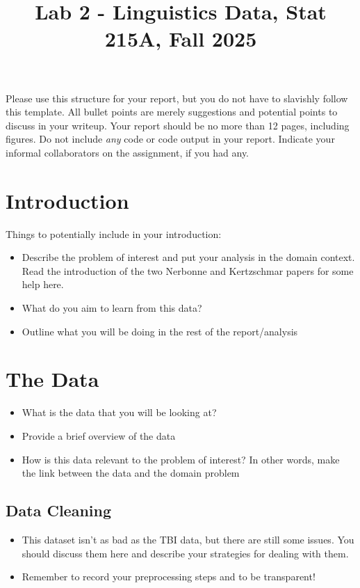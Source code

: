 \documentclass[10pt,letterpaper]{article}
\title{Lab 2 - Linguistics Data, Stat 215A, Fall 2025\vspace{-2em}}
\begin{document}
\maketitle

Please use this structure for your report, but you do not have to slavishly follow this template. All bullet points are merely suggestions and potential points to discuss in your writeup. Your report should be no more than 12 pages, including figures. Do not include \emph{any} code or code output in your report. Indicate your informal collaborators on the assignment, if you had any.

\section{Introduction}\label{introduction}

Things to potentially include in your introduction:

\begin{itemize}
\item Describe the problem of interest and put your analysis in the domain context. Read the introduction of the two Nerbonne and Kertzschmar papers for some help here.
\item What do you aim to learn from this data?
\item Outline what you will be doing in the rest of the report/analysis
\end{itemize}


\section{The Data}\label{data}

\begin{itemize}
\item What is the data that you will be looking at?
\item Provide a brief overview of the data
\item How is this data relevant to the problem of interest? In other words, make the link between the data and the domain problem

\end{itemize}

\subsection{Data Cleaning}\label{data-cleaning}

\begin{itemize}
\item This dataset isn't as bad as the TBI data, but there are still some issues. You should discuss them here and describe your strategies for dealing with them.
\item Remember to record your preprocessing steps and to be transparent!
\end{itemize}
\end{document}
